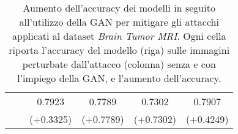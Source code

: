 \begin{table}[!h]
\begin{tabular}{|c||c|c|c|c|c|}
                                       & & 0.7923 & 0.7789 & 0.7302 & 0.7907 \\
                    \rule[-3mm]{0mm}{8mm}
                     & & (+0.3325) & (+0.7789) & (+0.7302) & (+0.4249)\\
                    \hline
                \end{tabular}
                \caption{Aumento dell'accuracy dei modelli in seguito all'utilizzo della GAN per mitigare gli attacchi applicati al dataset \textit{Brain Tumor MRI}.
                Ogni cella riporta l'accuracy del modello (riga) sulle immagini perturbate dall'attacco (colonna) senza e con l'impiego della GAN, e l'aumento dell'accuracy.}
                \label{Rise accuracy Brain Tumor MRI}
            \end{table}